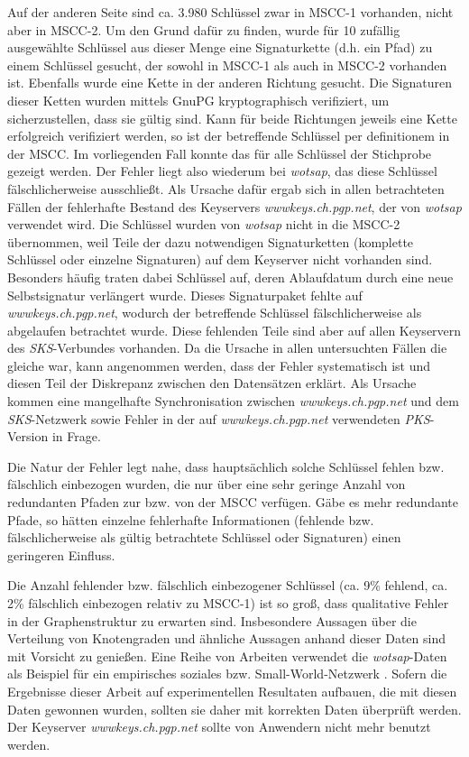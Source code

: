 Auf der anderen Seite sind ca. 3.980 Schlüssel zwar in MSCC-1
vorhanden, nicht aber in MSCC-2. Um den Grund dafür zu finden, wurde
für 10 zufällig ausgewählte Schlüssel aus dieser Menge eine
Signaturkette (d.h. ein Pfad) zu einem Schlüssel gesucht, der sowohl
in MSCC-1 als auch in MSCC-2 vorhanden ist. Ebenfalls wurde eine Kette
in der anderen Richtung gesucht. Die Signaturen dieser Ketten wurden
mittels GnuPG kryptographisch verifiziert, um sicherzustellen, dass
sie gültig sind. Kann für beide Richtungen jeweils eine Kette
erfolgreich verifiziert werden, so ist der betreffende Schlüssel per
definitionem in der MSCC. Im vorliegenden Fall konnte das für alle
Schlüssel der Stichprobe gezeigt werden. Der Fehler liegt also
wiederum bei \emph{wotsap}, das diese Schlüssel fälschlicherweise
ausschließt. Als Ursache dafür ergab sich in allen betrachteten
Fällen der fehlerhafte Bestand des Keyservers
\emph{wwwkeys.ch.pgp.net}, der von \emph{wotsap} verwendet wird. Die
Schlüssel wurden von \emph{wotsap} nicht in die MSCC-2 übernommen,
weil Teile der dazu notwendigen Signaturketten (komplette Schlüssel
oder einzelne Signaturen) auf dem Keyserver nicht vorhanden
sind. Besonders häufig traten dabei Schlüssel auf, deren
Ablaufdatum durch eine neue Selbstsignatur verlängert wurde. Dieses
Signaturpaket fehlte auf \emph{wwwkeys.ch.pgp.net}, wodurch der
betreffende Schlüssel fälschlicherweise als abgelaufen betrachtet
wurde. Diese fehlenden Teile sind aber auf allen Keyservern des
\emph{SKS}-Verbundes %
vorhanden. Da die Ursache in allen untersuchten Fällen die gleiche
war, kann angenommen werden, dass der Fehler systematisch ist und
diesen Teil der Diskrepanz zwischen den Datensätzen 
erklärt. Als Ursache kommen eine mangelhafte Synchronisation
zwischen \emph{wwwkeys.ch.pgp.net} und dem \emph{SKS}-Netzwerk sowie
Fehler in der auf \emph{wwwkeys.ch.pgp.net} verwendeten
\emph{PKS}-Version in Frage.

Die Natur der Fehler legt nahe, dass hauptsächlich solche Schlüssel
fehlen bzw. fälschlich einbezogen wurden, die nur über eine sehr
geringe Anzahl von redundanten Pfaden zur bzw. von der MSCC
verfügen. Gäbe es mehr redundante Pfade, so hätten einzelne
fehlerhafte Informationen (fehlende bzw. fälschlicherweise als gültig
betrachtete Schlüssel oder Signaturen) einen geringeren Einfluss.

Die Anzahl fehlender bzw. fälschlich einbezogener Schlüssel (ca. 9\%
fehlend, ca. 2\% fälschlich einbezogen relativ zu MSCC-1) ist so
groß, dass qualitative Fehler in der Graphenstruktur zu erwarten
sind. Insbesondere Aussagen über die Verteilung von Knotengraden und
ähnliche Aussagen anhand dieser Daten sind mit Vorsicht zu
genießen. Eine Reihe von Arbeiten verwendet die \emph{wotsap}-Daten
als Beispiel für ein empirisches soziales bzw. Small-World-Netzwerk
\cite{Brondsema2006, Heikkila2009, Dell'Amico2007}. Sofern
die Ergebnisse dieser Arbeit auf experimentellen Resultaten aufbauen,
die mit diesen Daten gewonnen wurden, sollten sie daher mit korrekten
Daten überprüft werden. Der Keyserver \emph{wwwkeys.ch.pgp.net} sollte
von Anwendern nicht mehr benutzt werden.

